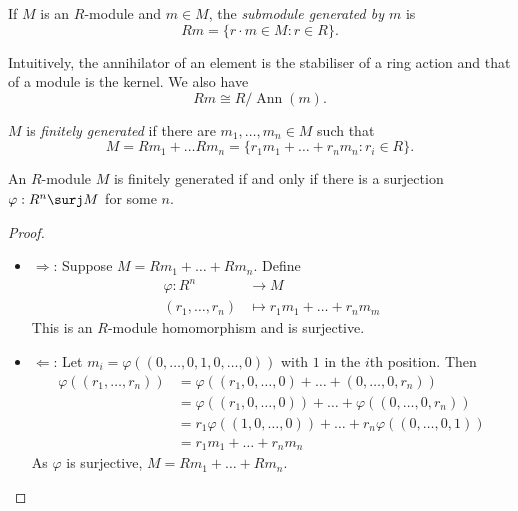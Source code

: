 \documentclass[a4paper]{article}
\theoremstyle{definition}
\DeclareMathOperator{\Ann}{Ann}
\begin{document}
\begin{definition}
  If \(M\) is an \(R\)-module and \(m \in M\), the \emph{submodule generated by \(m\)} is
  \[
    Rm = \{r \cdot m \in M: r \in R\}.
  \]
\end{definition}

\begin{note}
  Intuitively, the annihilator of an element is the stabiliser of a ring action and that of a module is the kernel. We also have
  \[
    Rm \cong R/\Ann(m).
  \]
\end{note}

\begin{definition}
  \(M\) is \emph{finitely generated} if there are \(m_1, \dots, m_n \in M\) such that
  \[
    M = Rm_1 + \dots Rm_n = \{r_1m_1 + \dots + r_nm_n: r_i \in R\}.
  \]
\end{definition}

\begin{lemma}
  An \(R\)-module \(M\) is finitely generated if and only if there is a surjection \(\varphi: R^n \surj M\) for some \(n\).
\end{lemma}

\begin{proof}\leavevmode
  \begin{itemize}
  \item \(\Rightarrow\): Suppose \(M = Rm_1 + \dots + Rm_n\). Define
    \begin{align*}
      \varphi: R^n &\to M \\
      (r_1, \dots, r_n) &\mapsto r_1m_1 + \dots + r_nm_m
    \end{align*}
    This is an \(R\)-module homomorphism and is surjective.
  \item \(\Leftarrow\): Let \(m_i = \varphi((0, \dots, 0, 1, 0, \dots, 0))\) with \(1\) in the \(i\)th position. Then
    \begin{align*}
      \varphi((r_1, \dots, r_n)) &= \varphi((r_1, 0, \dots, 0) + \dots + (0, \dots, 0, r_n)) \\
                                 &= \varphi((r_1, 0, \dots, 0)) + \dots + \varphi((0, \dots, 0, r_n)) \\
                                 &= r_1 \varphi((1, 0, \dots, 0)) + \dots + r_n \varphi((0, \dots, 0, 1)) \\
      &= r_1m_1 + \dots + r_nm_n
    \end{align*}
    As \(\varphi\) is surjective, \(M = Rm_1 + \dots + Rm_n\).
  \end{itemize}
\end{proof}
\end{document}
